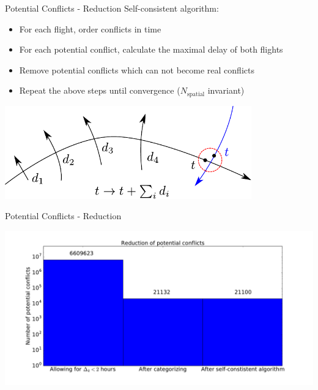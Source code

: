 \documentclass[10pt]{beamer}
\begin{document}
\begin{frame}[t]{Potential Conflicts - Reduction}
    Self-consistent algorithm:
    \begin{itemize}
        \item For each flight, order conflicts in time
        \item For each potential conflict, calculate the maximal delay of both flights
        \item Remove potential conflicts which can not become real conflicts
        \item Repeat the above steps until convergence ($N_\text{spatial}$ invariant) 
    \end{itemize}
    \begin{center}
        \includegraphics[width=0.8\textwidth]{images/potential_conflict_detection.pdf}
    \end{center}
\end{frame}
\begin{frame}[t]{Potential Conflicts - Reduction}
    \begin{center}
        \includegraphics[width=1.0\textwidth]{images/potential_conflict_reduction.pdf}
    \end{center}
\end{frame}
\end{document}
